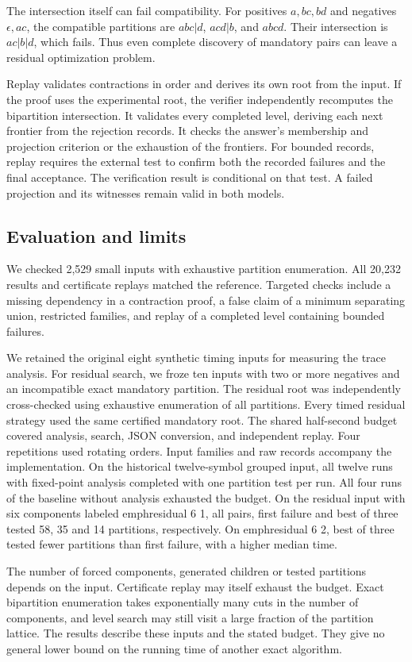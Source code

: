 The intersection itself can fail compatibility. For positives
\(a,bc,bd\) and negatives \(\epsilon,ac\), the compatible partitions
are \(abc|d\), \(acd|b\), and \(abcd\). Their intersection is
\(ac|b|d\), which fails. Thus even complete discovery of mandatory
pairs can leave a residual optimization problem.

Replay validates contractions in order and derives its own root
from the input. If the proof uses the experimental root, the verifier
independently recomputes the bipartition intersection. It validates
every completed level, deriving each next frontier from the rejection
records. It checks the answer's membership and projection criterion
or the exhaustion of the frontiers. For bounded records, replay
requires the external test to confirm both the recorded failures and
the final acceptance. The verification result is conditional on that
test. A failed projection and its witnesses remain valid in both
models.

\subsection{Evaluation and limits}

We checked 2,529 small inputs with exhaustive partition enumeration.
All 20,232 results and certificate replays matched the reference.
Targeted checks include a missing dependency in a contraction proof,
a false claim of a minimum separating union, restricted families,
and replay of a completed level containing bounded failures.

We retained the original eight synthetic timing inputs for measuring
the trace analysis. For residual search, we froze ten inputs with
two or more negatives and an incompatible exact mandatory partition.
The residual root was independently cross-checked using exhaustive
enumeration of all partitions. Every timed residual strategy used
the same certified mandatory root. The shared half-second budget
covered analysis, search, JSON conversion, and independent replay.
Four repetitions used rotating orders. Input families and raw
records accompany the implementation.
On the historical twelve-symbol grouped input, all twelve runs with
fixed-point analysis completed with one partition test per run.
All four runs of the baseline without analysis exhausted the budget.
On the residual input with six components labeled emph{residual 6 1},
all pairs, first failure and best of three tested 58, 35 and 14
partitions, respectively. On emph{residual 6 2}, best of three tested
fewer partitions than first failure, with a higher median time.


The number of forced components, generated children or tested
partitions depends on the input. Certificate replay may itself
exhaust the budget. Exact bipartition enumeration takes exponentially
many cuts in the number of components, and level search may still
visit a large fraction of the partition lattice. The results describe
these inputs and the stated budget. They give no general lower bound
on the running time of another exact algorithm.

